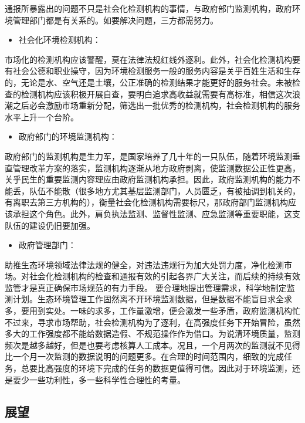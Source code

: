 \documentclass[]{book}
\providecommand{\tightlist}{%
  \setlength{\itemsep}{0pt}\setlength{\parskip}{0pt}}
\begin{document}
通报所暴露出的问题不只是社会化检测机构的事情，与政府部门监测机构，政府环境管理部门都是有关系的。如要解决问题，三方都需努力。

\begin{itemize}
\tightlist
\item
  社会化环境检测机构：
\end{itemize}

市场化的检测机构应该警醒，莫在法律法规红线外逐利。此外，社会化检测机构要有社会公德和职业操守，因为环境检测服务一般的服务内容是关乎百姓生活和生存的，无论是水、空气还是土壤，公正准确的检测结果才能更好的服务社会。未被检查的检测机构应该积极开展自查，要明白追求高收益就需要有高标准，相信这次浪潮之后必会激励市场重新分配，筛选出一批优秀的检测机构，社会检测机构的服务水平上升一个台阶。

\begin{itemize}
\tightlist
\item
  政府部门的环境监测机构：
\end{itemize}

政府部门的监测机构是生力军，是国家培养了几十年的一只队伍，随着环境监测垂直管理改革方案的落实，监测机构逐渐从地方政府剥离，使监测数据公正性更高，关乎民生的重要监测内容理应由政府监测机构承担。因此，政府监测机构的能力不能丢，队伍不能散（很多地方尤其基层监测部门，人员匮乏，有被抽调到机关的，有离职去第三方机构的），衡量社会化检测机构需要标尺，那政府部门监测机构应该承担这个角色。此外，肩负执法监测、监督性监测、应急监测等重要职能，这支队伍的建设仍旧要加强。

\begin{itemize}
\tightlist
\item
  政府管理部门：
\end{itemize}

助推生态环境领域法律法规的健全，对违法违规行为加大处罚力度，净化检测市场。对社会化检测机构的检查和通报有效的引起各界广大关注，而后续的持续有效监管才是真正确保市场规范的有力手段。
要合理地提出管理需求，科学地制定监测计划。生态环境管理工作固然离不开环境监测数据，但是数据不能盲目求全求多，要用到实处。一味的求多，工作量激增，便会激发一些矛盾，政府监测机构忙不过来，寻求市场帮助，社会检测机构为了逐利，在高强度任务下开始冒险，虽然多大的工作强度都不能给数据造假、不规范操作作为借口。为说清环境质量，监测频次是越多越好，但是也要考虑核算人工成本。况且，一个月两次的监测就不见得比一个月一次监测的数据说明的问题更多。在合理的时间范围内，细致的完成任务，总要比高强度的环境下完成的任务的数据更值得可信。因此对于环境监测，还是要少一些功利性，多一些科学性合理性的考量。

\hypertarget{ux5c55ux671b}{%
\subsection{展望}\label{ux5c55ux671b}}
\end{document}
